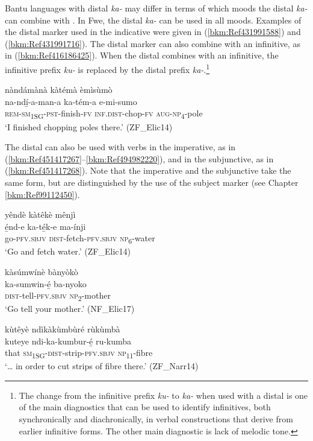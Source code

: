 Bantu languages with distal \textit{ka-} may differ in terms of which moods the distal \textit{ka-} can combine with \citep{Botne1999}. In Fwe, the distal \textit{ka-} can be used in all moods. Examples of the distal marker used in the indicative were given in (\ref{bkm:Ref431991588}) and (\ref{bkm:Ref431991716}). The distal marker can also combine with an infinitive, as in (\ref{bkm:Ref416186425}). When the distal combines with an infinitive, the infinitive prefix \textit{ku-} is replaced by the distal prefix \textit{ka-}.\footnote{The change from the infinitive prefix \textit{ku-} to \textit{ka-} when used with a distal is one of the main diagnostics that can be used to identify infinitives, both synchronically and diachronically, in verbal constructions that derive from earlier infinitive forms. The other main diagnostic is lack of melodic tone.}

\ea
\label{bkm:Ref416186425}
nàndámànà kàtémà èmìsùmò\\
\gll na-ndí̲-a-man-a    ka-tém-a    e-mi-sumo\\
\textsc{rem}-\textsc{sm}\textsubscript{1SG}-\textsc{pst}-finish-\textsc{fv}  \textsc{inf}.\textsc{dist}-chop-\textsc{fv}  \textsc{aug}-\textsc{np}\textsubscript{4}-pole\\
\glt ‘I finished chopping poles there.’ (ZF\_Elic14)
\z

The distal can also be used with verbs in the imperative, as in (\ref{bkm:Ref451417267}--\ref{bkm:Ref494982220}), and in the subjunctive, as in (\ref{bkm:Ref451417268}). Note that the imperative and the subjunctive take the same form, but are distinguished by the use of the subject marker (see Chapter \ref{bkm:Ref99112450}).

\ea
\label{bkm:Ref451417267}
yêndè kàtêkè mênjì\\
\gll é̲nd-e    ka-té̲k-e    ma-ínji\\
go-\textsc{pfv}.\textsc{sbjv}  \textsc{dist}-fetch-\textsc{pfv}.\textsc{sbjv}  \textsc{np}\textsubscript{6}-water\\
\glt ‘Go and fetch water.’ (ZF\_Elic14)
\z

\ea
\label{bkm:Ref494982220}
kàsúmwínè bànyòkò\\
\gll ka-sumwin-é̲  ba-nyoko\\
\textsc{dist}-tell-\textsc{pfv}.\textsc{sbjv}  \textsc{np}\textsubscript{2}-mother\\
\glt ‘Go tell your mother.’ (NF\_Elic17)
\z

\ea
\label{bkm:Ref451417268}
kùtêyè ndìkàkùmbùré rùkùmbà\\
\gll kuteye  ndi-ka-kumbur-é̲    ru-kumba\\
that    \textsc{sm}\textsubscript{1SG}-\textsc{dist}-strip-\textsc{pfv}.\textsc{sbjv}  \textsc{np}\textsubscript{11}-fibre\\
\glt ‘… in order to cut strips of fibre there.’ (ZF\_Narr14)
\z

